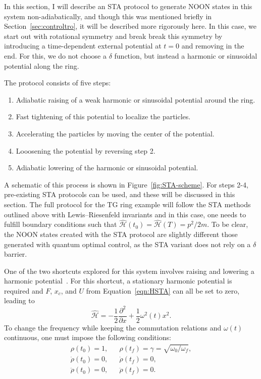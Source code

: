 In this section, I will describe an STA protocol to generate NOON states in this system non-adiabatically, and though this was mentioned briefly in Section~\ref{sec:controltro}, it will be described more rigorously here.
In this case, we start out with rotational symmetry and break break this symmetry by introducing a time-dependent external potential at $t=0$ and removing in the end.
For this, we do not choose a $\delta$ function, but instead a harmonic or sinusoidal potential along the ring.

The protocol consists of five steps:
\begin{enumerate}
\item Adiabatic raising of a weak harmonic or sinusoidal potential around the ring.
\item Fast tightening of this potential to localize the particles.
\item Accelerating the particles by moving the center of the potential.
\item Looosening the potential by reversing step 2.
\item Adiabatic lowering of the harmonic or sinusoidal potential.
\end{enumerate}
A schematic of this process is shown in Figure~\ref{fig:STA-scheme}.
For steps 2-4, pre-existing STA protocols can be used, and these will be discussed in this section.
The full protocol for the TG ring example will follow the STA methods outlined above with Lewis--Riesenfeld invariants and in this case, one needs to fulfill boundary conditions such that $\mathcal{\hat H}(t_0) = \mathcal{\hat H}(T)=p^2/2m$.
To be clear, the NOON states created with the STA protocol are slightly different those generated with quantum optimal control, as the STA variant does not rely on a $\delta$ barrier.

One of the two shortcuts explored for this system involves raising and lowering a harmonic potential~\cite{chen2010,chen20102}.
For this shortcut, a stationary harmonic potential is required and $F$, $x_c$, and $U$ from Equation~\eqref{eqn:HSTA} can all be set to zero, leading to
\begin{equation}
 \mathcal{\hat H}= -\frac{1}{2} \frac{\partial^2}{\partial x}+ \frac 1 2 \omega^2(t) x^2.
\end{equation}
\noindent To change the frequency while keeping the commutation relations and $\omega(t)$ continuous, one must impose the following conditions:
\begin{equation}
 \begin{array}{lcl}
\rho(t_0)=1, && \rho(t_f)=\gamma=\sqrt{\omega_0 / \omega_f},\\
\dot \rho(t_0)=0, && \dot \rho(t_f) =0, \\
\ddot \rho(t_0)=0, && \ddot \rho(t_f)=0.
\end{array} \label{eqn:squeeze}
\end{equation}

